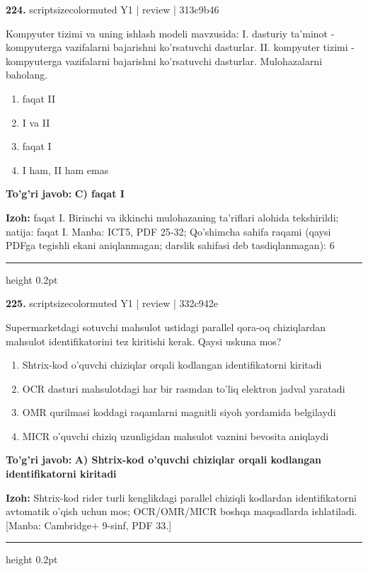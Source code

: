\documentclass[10pt,a4paper]{article}
\begin{document}
{\bfseries\sffamily\color{ink} 224.} {scriptsizecolor{muted} Y1 | review | 313c9b46}
\par
Kompyuter tizimi va uning ishlash modeli mavzusida: I. dasturiy ta'minot - kompyuterga vazifalarni bajarishni ko'rsatuvchi dasturlar. II. kompyuter tizimi - kompyuterga vazifalarni bajarishni ko'rsatuvchi dasturlar. Mulohazalarni baholang.
\begin{enumerate}[label=\Alph*),leftmargin=9mm]
\item faqat II
\item I va II
\item faqat I
\item I ham, II ham emas
\end{enumerate}
\begin{tcolorbox}[enhanced,breakable,colback=teal!4,colframe=teal!60!black,boxrule=0.45pt,arc=1.2mm,left=2.7mm,right=2.7mm,top=1.8mm,bottom=1.8mm,before skip=2mm,after skip=2mm]
{\bfseries\sffamily\color{teal}To'g'ri javob:} \textbf{C) faqat I}
\par\smallskip
{\bfseries Izoh:} faqat I. Birinchi va ikkinchi mulohazaning ta'riflari alohida tekshirildi; natija: faqat I. Manba: ICT5, PDF 25-32; Qo'shimcha sahifa raqami (qaysi PDFga tegishli ekani aniqlanmagan; darslik sahifasi deb tasdiqlanmagan): 6
\end{tcolorbox}
\vspace{2mm}\hrule height 0.2pt\vspace{3mm}

{\bfseries\sffamily\color{ink} 225.} {scriptsizecolor{muted} Y1 | review | 332c942e}
\par
Supermarketdagi sotuvchi mahsulot ustidagi parallel qora-oq chiziqlardan mahsulot identifikatorini tez kiritishi kerak. Qaysi uskuna mos?
\begin{enumerate}[label=\Alph*),leftmargin=9mm]
\item Shtrix-kod o'quvchi chiziqlar orqali kodlangan identifikatorni kiritadi
\item OCR dasturi mahsulotdagi har bir rasmdan to'liq elektron jadval yaratadi
\item OMR qurilmasi koddagi raqamlarni magnitli siyoh yordamida belgilaydi
\item MICR o'quvchi chiziq uzunligidan mahsulot vaznini bevosita aniqlaydi
\end{enumerate}
\begin{tcolorbox}[enhanced,breakable,colback=teal!4,colframe=teal!60!black,boxrule=0.45pt,arc=1.2mm,left=2.7mm,right=2.7mm,top=1.8mm,bottom=1.8mm,before skip=2mm,after skip=2mm]
{\bfseries\sffamily\color{teal}To'g'ri javob:} \textbf{A) Shtrix-kod o'quvchi chiziqlar orqali kodlangan identifikatorni kiritadi}
\par\smallskip
{\bfseries Izoh:} Shtrix-kod rider turli kenglikdagi parallel chiziqli kodlardan identifikatorni avtomatik o'qish uchun mos; OCR/OMR/MICR boshqa maqsadlarda ishlatiladi. [Manba: Cambridge+ 9-sinf, PDF 33.]
\end{tcolorbox}
\vspace{2mm}\hrule height 0.2pt\vspace{3mm}
\end{document}
